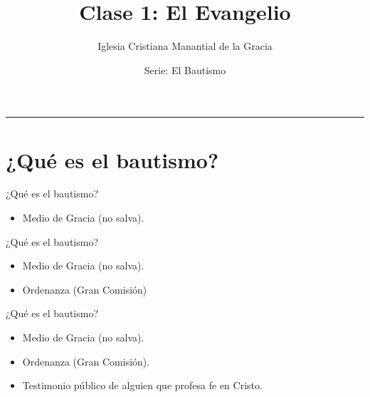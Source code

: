 \documentclass[17pt, aspectratio=169]{beamer}
\title{Clase 1: El Evangelio}
\author{Iglesia Cristiana Manantial de la Gracia}
\date{Serie: El Bautismo}
\begin{document}
\begin{frame}[plain]
    \titlepage
    \centering
    \color{ICMGGold}\rule{0.5\textwidth}{1pt}
\end{frame}

\section{¿Qué es el bautismo?}

\begin{frame}{¿Qué es el bautismo?}
    \begin{itemize}
        \item Medio de Gracia (no salva).
    \end{itemize}
\end{frame}

\begin{frame}{¿Qué es el bautismo?}
    \begin{itemize}
        \item Medio de Gracia (no salva).
        \item Ordenanza (Gran Comisión)
    \end{itemize}
\end{frame}

\begin{frame}{¿Qué es el bautismo?}
    \begin{itemize}
        \item Medio de Gracia (no salva).
        \item Ordenanza (Gran Comisión).
        \item Testimonio público de alguien que profesa fe en Cristo.
    \end{itemize}
\end{frame}

    
    
\end{document}
